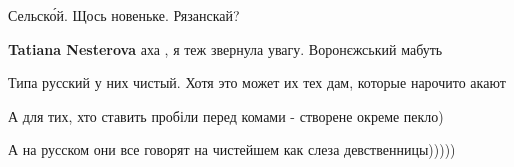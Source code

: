\begin{itemize}
{\begin{itemize}
{}\end{itemize}

 
Сельско́й. Щось новеньке. Рязанскай?

\begin{itemize}{
 
\textbf{Tatiana Nesterova} аха , я теж звернула увагу. Воронєжський мабуть
}\end{itemize}

 
Типа русский у них чистый. Хотя это может их тех дам, которые нарочито акают

 
А для тих, хто ставить пробіли перед комами - створене окреме пекло)

 
А на русском они все говорят на чистейшем как слеза девственницы)))))

\begin{itemize}{
 
}
\end{itemize}}
\end{itemize}
